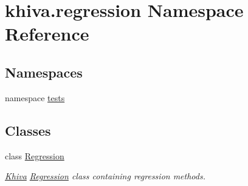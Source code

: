 \hypertarget{namespacekhiva_1_1regression}{}\section{khiva.\+regression Namespace Reference}
\label{namespacekhiva_1_1regression}
\subsection*{Namespaces}
\begin{DoxyCompactItemize}
\item 
namespace \mbox{\hyperlink{namespacekhiva_1_1regression_1_1tests}{tests}}
\end{DoxyCompactItemize}
\subsection*{Classes}
\begin{DoxyCompactItemize}
\item 
class \mbox{\hyperlink{classkhiva_1_1regression_1_1_regression}{Regression}}
\begin{DoxyCompactList}\small\item\em \mbox{\hyperlink{classkhiva_1_1_khiva}{Khiva}} \mbox{\hyperlink{classkhiva_1_1regression_1_1_regression}{Regression}} class containing regression methods. \end{DoxyCompactList}\end{DoxyCompactItemize}

